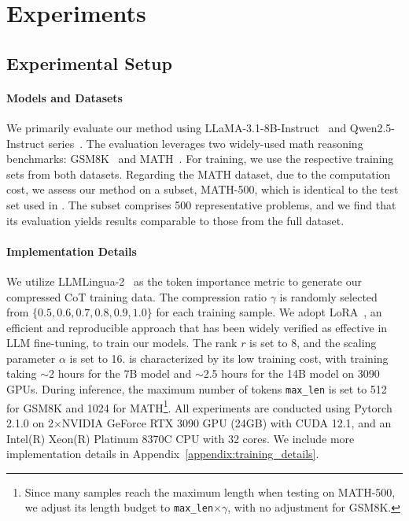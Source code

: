 \section{Experiments}
\subsection{Experimental Setup}
\label{sec:exp_setup}

\paragraph{Models and Datasets} 
We primarily evaluate our method using LLaMA-3.1-8B-Instruct~\cite{dubey:2024llama3} and Qwen2.5-Instruct series~\cite{Qwen2}. The evaluation leverages two widely-used math reasoning benchmarks: GSM8K~\citep{Cobbe:2021gsm8k} and MATH~\cite{math}. For training, we use the respective training sets from both datasets. Regarding the MATH dataset, due to the computation cost, we assess our method on a subset, MATH-500, which is identical to the test set used in \citet{Lightman:2024verify}. The subset comprises 500 representative problems, and we find that its evaluation yields results comparable to those from the full dataset.

\paragraph{Implementation Details} 
We utilize LLMLingua-2~\cite{pan:2024llmlingua2} as the token importance metric to generate our compressed CoT training data. The compression ratio $\gamma$ is randomly selected from $\{0.5, 0.6, 0.7, 0.8, 0.9, 1.0\}$ for each training sample. We adopt LoRA~\cite{lora}, an efficient and reproducible approach that has been widely verified as effective in LLM fine-tuning, to train our models. The rank $r$ is set to 8, and the scaling parameter $\alpha$ is set to 16. \method is characterized by its low training cost, with training taking $\sim$2 hours for the 7B model and $\sim$2.5 hours for the 14B model on 3090 GPUs. During inference, the maximum number of tokens \texttt{max\_len} is set to 512 for GSM8K and 1024 for MATH\footnote{Since many samples reach the maximum length when testing \method on MATH-500, we adjust its length budget to \texttt{max\_len}$\times\gamma$, with no adjustment for GSM8K.}. All experiments are conducted using Pytorch 2.1.0 on 2$\times$NVIDIA GeForce RTX 3090 GPU (24GB) with CUDA 12.1, and an Intel(R) Xeon(R) Platinum 8370C CPU with 32 cores. We include more implementation details in Appendix~\ref{appendix:training_details}.

